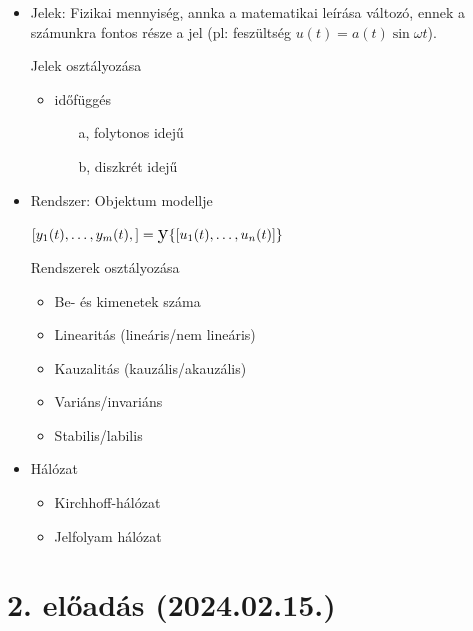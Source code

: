 \documentclass[12pt]{article}
\begin{document}
            \begin{itemize}
                \item Jelek: Fizikai mennyiség, annka a matematikai leírása változó, ennek a számunkra fontos része a jel (pl: feszültség $u(t) = a(t) \sin \omega t$).
                
                    Jelek osztályozása \begin{itemize}
                        \item időfüggés
                        \begin{itemize}
                            \item[a,] folytonos idejű
                            \item[b,] diszkrét idejű
                        \end{itemize}
                    \end{itemize}
                \item Rendszer: Objektum modellje
                
                    $[y_1(t), \dots, y_m(t), ] = \scalebox{1.5}{y} \{[u_1(t), \dots, u_n(t)]\}$


                    Rendszerek osztályozása \begin{itemize}
                        \item Be- és kimenetek száma
                        \item Linearitás (lineáris/nem lineáris)
                        \item Kauzalitás (kauzális/akauzális)
                        \item Variáns/invariáns
                        \item Stabilis/labilis
                    \end{itemize}
                \item Hálózat
                    \begin{itemize}
                        \item Kirchhoff-hálózat
                        \item Jelfolyam hálózat
                    \end{itemize}
            \end{itemize}

        

	\section{2. előadás (2024.02.15.)}
\end{document}
